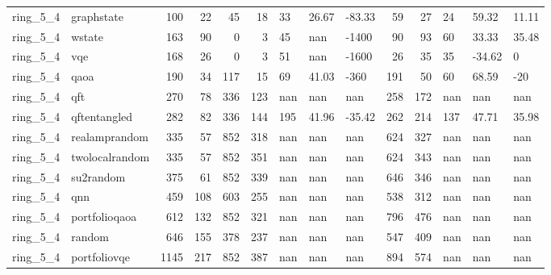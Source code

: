 \begin{longtable}{llrrrrlllrrlll}
ring\_5\_4 & graphstate & 100 & 22 & 45 & 18 & 33 & 26.67 & -83.33 & 59 & 27 & 24 & 59.32 & 11.11 \\
ring\_5\_4 & wstate & 163 & 90 & 0 & 3 & 45 & nan & -1400 & 90 & 93 & 60 & 33.33 & 35.48 \\
ring\_5\_4 & vqe & 168 & 26 & 0 & 3 & 51 & nan & -1600 & 26 & 35 & 35 & -34.62 & 0 \\
ring\_5\_4 & qaoa & 190 & 34 & 117 & 15 & 69 & 41.03 & -360 & 191 & 50 & 60 & 68.59 & -20 \\
ring\_5\_4 & qft & 270 & 78 & 336 & 123 & nan & nan & nan & 258 & 172 & nan & nan & nan \\
ring\_5\_4 & qftentangled & 282 & 82 & 336 & 144 & 195 & 41.96 & -35.42 & 262 & 214 & 137 & 47.71 & 35.98 \\
ring\_5\_4 & realamprandom & 335 & 57 & 852 & 318 & nan & nan & nan & 624 & 327 & nan & nan & nan \\
ring\_5\_4 & twolocalrandom & 335 & 57 & 852 & 351 & nan & nan & nan & 624 & 343 & nan & nan & nan \\
ring\_5\_4 & su2random & 375 & 61 & 852 & 339 & nan & nan & nan & 646 & 346 & nan & nan & nan \\
ring\_5\_4 & qnn & 459 & 108 & 603 & 255 & nan & nan & nan & 538 & 312 & nan & nan & nan \\
ring\_5\_4 & portfolioqaoa & 612 & 132 & 852 & 321 & nan & nan & nan & 796 & 476 & nan & nan & nan \\
ring\_5\_4 & random & 646 & 155 & 378 & 237 & nan & nan & nan & 547 & 409 & nan & nan & nan \\
ring\_5\_4 & portfoliovqe & 1145 & 217 & 852 & 387 & nan & nan & nan & 894 & 574 & nan & nan & nan \\
\end{longtable}
